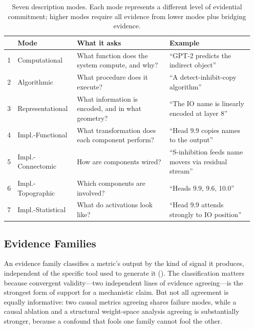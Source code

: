\documentclass[10pt]{article}
\begin{document}
\begin{table}[H]
\centering
\small
\caption{Seven description modes. Each mode represents a different level of evidential commitment; higher modes require all evidence from lower modes plus bridging evidence.}
\label{tab:modes}
\renewcommand{\arraystretch}{1.2}
\begin{tabular}{@{}rl>{\raggedright\arraybackslash}p{4.8cm}>{\raggedright\arraybackslash}p{5.2cm}@{}}
\toprule
& \textbf{Mode} & \textbf{What it asks} & \textbf{Example} \\
\midrule
1 & Computational & What function does the system compute, and why? & ``GPT-2 predicts the indirect object'' \\
\midrule
2 & Algorithmic & What procedure does it execute? & ``A detect-inhibit-copy algorithm'' \\
\midrule
3 & Representational & What information is encoded, and in what geometry? & ``The IO name is linearly encoded at layer 8'' \\
\midrule
4 & Impl.-Functional & What transformation does each component perform? & ``Head 9.9 copies names to the output'' \\
\midrule
5 & Impl.-Connectomic & How are components wired? & ``S-inhibition feeds name movers via residual stream'' \\
\midrule
6 & Impl.-Topographic & Which components are involved? & ``Heads 9.9, 9.6, 10.0'' \\
\midrule
7 & Impl.-Statistical & What do activations look like? & ``Head 9.9 attends strongly to IO position'' \\
\bottomrule
\end{tabular}
\end{table}

\subsection{Evidence Families}
\label{sec:evidence-families}

An evidence family classifies a metric's output by the kind of signal it produces, independent of the specific tool used to generate it (). The classification matters because convergent validity---two independent lines of evidence agreeing---is the strongest form of support for a mechanistic claim. But not all agreement is equally informative: two causal metrics agreeing shares failure modes, while a causal ablation and a structural weight-space analysis agreeing is substantially stronger, because a confound that fools one family cannot fool the other.
\end{document}
